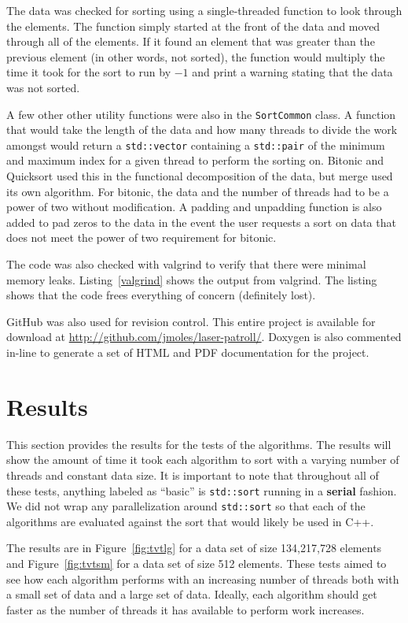 \documentclass[journal]{IEEEtran}
\newcommand{\bashout}[2]{
\begin{figure}

\end{figure}
}
\begin{document}
The data was checked for sorting using a single-threaded function to look through the elements. The function simply started at the front of the data and moved through all of the elements. If it found an element that was greater than the previous element (in other words, not sorted), the function would multiply the time it took for the sort to run by $-1$ and print a warning stating that the data was not sorted.

A few other other utility functions were also in the \texttt{SortCommon} class. A function that would take the length of the data and how many threads to divide the work amongst would return a \texttt{std::vector} containing a \texttt{std::pair} of the minimum and maximum index for a given thread to perform the sorting on. Bitonic and Quicksort used this in the functional decomposition of the data, but merge used its own algorithm. For bitonic, the data and the number of threads had to be a power of two without modification. A padding and unpadding function is also added to pad zeros to the data in the event the user requests a sort on data that does not meet the power of two requirement for bitonic.

The code was also checked with valgrind to verify that there were minimal memory leaks. Listing~\ref{valgrind} shows the output from valgrind. The listing shows that the code frees everything of concern (definitely lost).

\bashout{valgrind}{Valgrind Output}

GitHub was also used for revision control. This entire project is available for download at \url{http://github.com/jmoles/laser-patroll/}. Doxygen is also commented in-line to generate a set of HTML and PDF documentation for the project.


\section{Results}
\label{sec:results}
This section provides the results for the tests of the algorithms. The results will show the amount of time it took each algorithm to sort with a varying number of threads and constant data size. It is important to note that throughout all of these tests, anything labeled as ``basic'' is \texttt{std::sort} running in a \textbf{serial} fashion. We did not wrap any parallelization around \texttt{std::sort} so that each of the algorithms are evaluated against the sort that would likely be used in C++.

The results are in Figure~\ref{fig:tvtlg} for a data set of size 134,217,728 elements and Figure~\ref{fig:tvtsm} for a data set of size 512 elements. These tests aimed to see how each algorithm performs with an increasing number of threads both with a small set of data and a large set of data. Ideally, each algorithm should get faster as the number of threads it has available to perform work increases.
\end{document}
